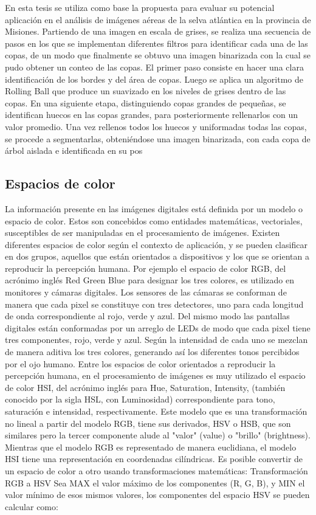 En esta tesis se utiliza como base la propuesta \cite{ferreira_tree_2019} para evaluar su potencial aplicación en el análisis de imágenes aéreas de la selva atlántica en la provincia de Misiones.
Partiendo de una imagen en escala de grises, se realiza una secuencia de pasos en los que se implementan diferentes filtros para identificar cada una de las copas, de un modo que finalmente se obtuvo una imagen binarizada con la cual se pudo obtener un conteo de las copas. El primer paso consiste en hacer una clara identificación de los bordes y del área de copas. Luego se aplica un algoritmo de Rolling Ball \cite{sternberg_biomedical_1983} que produce un suavizado en los niveles de grises dentro de las copas. En una siguiente etapa, distinguiendo copas grandes de pequeñas, se identifican huecos en las copas grandes, para posteriormente rellenarlos con un valor promedio. Una vez rellenos todos los huecos y uniformadas todas las copas, se procede a segmentarlas, obteniéndose una imagen binarizada, con cada copa de árbol aislada e identificada en su pos
\subsection{Espacios de color} \label{espacio_color}

La información presente en las imágenes digitales está definida por un modelo o espacio de color. Estos son concebidos como entidades matemáticas, vectoriales, susceptibles de ser manipuladas en el procesamiento de imágenes. Existen diferentes espacios de color según el contexto de aplicación, y se pueden clasificar en dos grupos, aquellos que están orientados a dispositivos y los que se orientan a reproducir la percepción humana. Por ejemplo el espacio de color RGB, del acrónimo inglés Red Green Blue para designar los tres colores, es utilizado en monitores y cámaras digitales. Los sensores de las cámaras se conforman de manera que cada pixel se constituye con tres detectores, uno para cada longitud de onda correspondiente al rojo, verde y azul. Del mismo modo las pantallas digitales están conformadas por un arreglo de LEDs de modo que cada pixel tiene tres componentes, rojo, verde y azul. Según la intensidad de cada uno se mezclan de manera aditiva los tres colores, generando así los diferentes tonos percibidos por el ojo humano.
Entre los espacios de color orientados a reproducir la percepción humana, en el procesamiento de imágenes es muy utilizado el espacio de color HSI, del acrónimo inglés para Hue, Saturation, Intensity, (también conocido por la sigla HSL, con Luminosidad) correspondiente para tono, saturación e intensidad, respectivamente. Este modelo que es una transformación no lineal a partir del modelo RGB, tiene sus derivados, HSV o HSB, que son similares pero la tercer componente alude al "valor" (value) o "brillo" (brightness). Mientras que el modelo RGB es representado de manera euclidiana, el modelo HSI tiene una representación en coordenadas cilíndricas.
Es posible convertir de un espacio de color a otro usando transformaciones matemáticas:
Transformación RGB a HSV
Sea MAX el valor máximo de los componentes (R, G, B), y MIN el valor mínimo de esos mismos valores, los componentes del espacio HSV se pueden calcular como:

